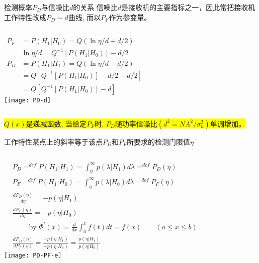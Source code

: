 \begin{frame}[shrink]{检测概率$P_D$与信噪比$d$的关系}
信噪比$d$是接收机的主要指标之一，因此常把接收机工作特性改成$P_D\sim d$曲线, 而以$P_F$作为参变量。
\begin{columns}
	\begin{align*}
	P_F&=P(H_1|H_0)=Q(\ln\eta/d+d/2)\\ 
	&\ln\eta/d=Q^{-1}[P(H_1|H_0)]-d/2\\
	P_D&=P(H_1|H_1)=Q\left(\ln\eta/d-d/2\right)\\
	&=Q[Q^{-1}[P(H_1|H_0)]-d/2-d/2]\\
	&=Q[Q^{-1}[P(H_1|H_0)]-d]
	\end{align*}
	\texttt{[image: PD-d]}
\end{columns}

\medskip

\colorbox{yellow}{$Q(x)$是递减函数, 当给定$P_F$时, $P_D$随功率信噪比$(d^2=NA^2/\sigma_n^2)$单调增加。} 
\end{frame}

\begin{frame}[shrink]{工作特性某点上的斜率等于该点$P_D$和$P_F$所要求的检测门限值$\eta$}
\begin{columns}
	\begin{align*}
	&P_D\mathop{=}^{def}P(H_1|H_1)=\int_{\eta}^{\infty}p(\lambda|H_1)d\lambda\mathop{=}^{def}P_D(\eta) \\
	&P_F\mathop{=}^{def}P(H_1|H_0)=\int_{\eta}^{\infty}p(\lambda|H_0)d\lambda\mathop
	{=}^{def}P_F(\eta) \\
	&\frac{dP_D(\eta)}{d\eta} =-p(\eta|H_1) \\ 
	&\frac{dP_F(\eta)}{d\eta} =-p(\eta|H_0) \\ 
	&\qquad \text{ by } \Phi^\prime(x)=\frac{d}{dx}\int_a^xf(t)dt=f(x)\qquad (a\le x\le b) \\
	&\frac{dP_D(\eta)}{dP_F(\eta)} =\frac{-p(\eta|H_1)}{-p(\eta|H_0)}=\frac{p(\eta|H_1)}{p(\eta|H_0)}
	\end{align*}
	\texttt{[image: PD-PF-e]}
\end{columns}
\end{frame}

